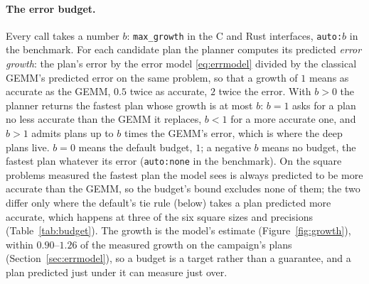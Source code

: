 \documentclass[11pt]{article}
\newcommand{\lv}[1]{\texttt{#1}}
\begin{document}
\paragraph{The error budget.}\label{par:budget}
Every call takes a number $b$: \lv{max\_growth} in the C and Rust
interfaces, \lv{auto:}$b$ in the benchmark.  For each candidate plan the
planner computes its predicted \emph{error growth}: the plan's
error by the error model \eqref{eq:errmodel}
divided by the classical GEMM's predicted error on the same problem,
so that a growth of $1$ means as accurate as the GEMM, $0.5$ twice as
accurate, $2$ twice the error.  With $b>0$ the planner returns the fastest
plan whose growth is at most $b$: $b=1$ asks for a plan no less accurate than
the GEMM it replaces, $b<1$ for a more accurate one, and $b>1$ admits plans
up to $b$ times the GEMM's error, which is where the deep plans live.
$b=0$ means the default budget, $1$; a negative $b$ means no budget, the
fastest plan whatever its error (\lv{auto:none} in the benchmark).  On the
square problems measured the fastest plan the model sees is always predicted
to be more accurate than the GEMM, so the budget's bound excludes none of
them; the two differ only where the default's tie rule (below) takes a plan
predicted more accurate, which happens at three of the six square sizes and
precisions (Table~\ref{tab:budget}).  The growth is the model's estimate (Figure~\ref{fig:growth}), within $0.90$--$1.26$ of the measured growth on the campaign's plans (Section~\ref{sec:errmodel}), so a
budget is a target rather than a guarantee, and a plan predicted just under
it can measure just over.
\end{document}
